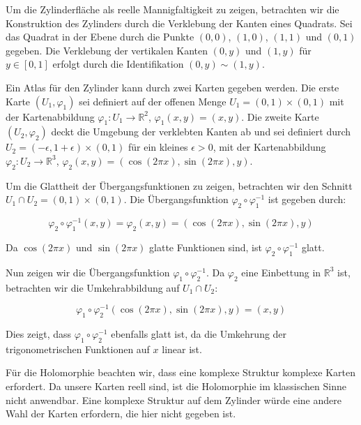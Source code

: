 Um die Zylinderfläche als reelle Mannigfaltigkeit zu zeigen, betrachten wir die Konstruktion des Zylinders durch die Verklebung der Kanten eines Quadrats. Sei das Quadrat in der Ebene durch die Punkte \((0,0)\), \((1,0)\), \((1,1)\) und \((0,1)\) gegeben. Die Verklebung der vertikalen Kanten \((0,y)\) und \((1,y)\) für \(y \in [0,1]\) erfolgt durch die Identifikation \((0,y) \sim (1,y)\).

Ein Atlas für den Zylinder kann durch zwei Karten gegeben werden. Die erste Karte \((U_1, \varphi_1)\) sei definiert auf der offenen Menge \(U_1 = (0,1) \times (0,1)\) mit der Kartenabbildung \(\varphi_1: U_1 \to \mathbb{R}^2\), \(\varphi_1(x,y) = (x,y)\). Die zweite Karte \((U_2, \varphi_2)\) deckt die Umgebung der verklebten Kanten ab und sei definiert durch \(U_2 = (-\epsilon, 1+\epsilon) \times (0,1)\) für ein kleines \(\epsilon > 0\), mit der Kartenabbildung \(\varphi_2: U_2 \to \mathbb{R}^3\), \(\varphi_2(x,y) = (\cos(2\pi x), \sin(2\pi x), y)\).

Um die Glattheit der Übergangsfunktionen zu zeigen, betrachten wir den Schnitt \(U_1 \cap U_2 = (0,1) \times (0,1)\). Die Übergangsfunktion \(\varphi_2 \circ \varphi_1^{-1}\) ist gegeben durch:

\[
\varphi_2 \circ \varphi_1^{-1}(x,y) = \varphi_2(x,y) = (\cos(2\pi x), \sin(2\pi x), y)
\]

Da \(\cos(2\pi x)\) und \(\sin(2\pi x)\) glatte Funktionen sind, ist \(\varphi_2 \circ \varphi_1^{-1}\) glatt.

Nun zeigen wir die Übergangsfunktion \(\varphi_1 \circ \varphi_2^{-1}\). Da \(\varphi_2\) eine Einbettung in \(\mathbb{R}^3\) ist, betrachten wir die Umkehrabbildung auf \(U_1 \cap U_2\):

\[
\varphi_1 \circ \varphi_2^{-1}(\cos(2\pi x), \sin(2\pi x), y) = (x, y)
\]

Dies zeigt, dass \(\varphi_1 \circ \varphi_2^{-1}\) ebenfalls glatt ist, da die Umkehrung der trigonometrischen Funktionen auf \(x\) linear ist.

Für die Holomorphie beachten wir, dass eine komplexe Struktur komplexe Karten erfordert. Da unsere Karten reell sind, ist die Holomorphie im klassischen Sinne nicht anwendbar. Eine komplexe Struktur auf dem Zylinder würde eine andere Wahl der Karten erfordern, die hier nicht gegeben ist.

